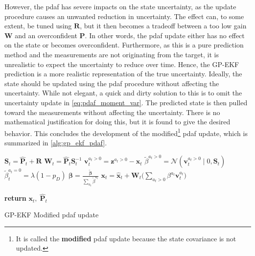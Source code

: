 However, the \acrshort{pdaf} has severe impacts on the state uncertainty, as the update procedure causes an unwanted reduction in uncertainty. The effect can, to some extent, be tuned using $\mathbf{R}$, but it then becomes a tradeoff between a too low gain $\boldsymbol{W}$ and an overconfident $\boldsymbol{P}$. In other words, the \acrshort{pdaf} update either has no effect on the state or becomes overconfident. Furthermore, as this is a pure prediction method and the measurements are not originating from the target, it is unrealistic to expect the uncertainty to reduce over time. Hence, the GP-EKF prediction is a more realistic representation of the true uncertainty. Ideally, the state should be updated using the \acrshort{pdaf} procedure without affecting the uncertainty. While not elegant, a quick and dirty solution to this is to omit the uncertainty update in \cref{eq:pdaf_moment_var}. The predicted state is then pulled toward the measurements without affecting the uncertainty. There is no mathematical justification for doing this, but it is found to give the desired behavior. This concludes the development of the modified{\footnote{It is called the \textbf{modified} \acrshort{pdaf} update because the state covariance is not updated.}} \acrshort{pdaf} update, which is summarized in \cref{alg:gp_ekf_pdaf}.

\begin{algorithm}[h]
    \begin{algorithmic}[1]
        \State $\boldsymbol{S}_t = \hat{\boldsymbol{P}}_t + \boldsymbol{R}$ 
        \State $\boldsymbol{W}_t = \hat{\boldsymbol{P}}_t \boldsymbol{S}_t^{-1}$
        \State $\boldsymbol{v}_t^{a_t>0} = \boldsymbol{z}^{a_t>0} - \hat{\boldsymbol{x}}_t$ 
        \State $\tilde{\beta}^{a_t>0} = \mathcal{N}(\boldsymbol{v}_t^{a_t > 0} \; | \; 0, \boldsymbol{S}_t)$ 
        \EndFor
        \State $\tilde{\beta}_t^{a_t = 0} = \lambda (1-p_D)$ 
        \State $\boldsymbol{\beta} = \frac{\tilde{\boldsymbol{\beta}}}{\sum_{a_t} \tilde{\beta}^{a_t}}$ 
        \State $\boldsymbol{x}_t = \hat{\boldsymbol{x}}_t + \boldsymbol{W}_t \big(\sum_{a_t > 0} \beta^{a_t} \boldsymbol{v}_t^{a_t} \big)$


        \State \textbf{return} $\boldsymbol{x}_t, \; \hat{\boldsymbol{P}}_t$
        \EndProcedure
    \end{algorithmic}
    \caption{GP-EKF Modified \acrshort{pdaf} update}
    \label{alg:gp_ekf_pdaf}
\end{algorithm}


